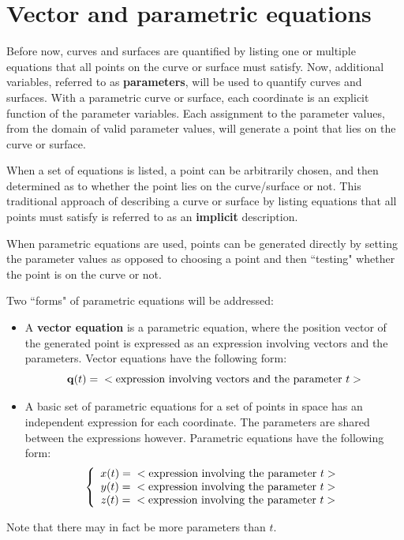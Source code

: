 \documentclass{article}
\begin{document}
\section*{Vector and parametric equations}

Before now, curves and surfaces are quantified by listing one or multiple equations that all points on the curve or surface must satisfy. Now, additional variables, referred to as {\bf parameters}, will be used to quantify curves and surfaces. With a parametric curve or surface, each coordinate is an explicit function of the parameter variables. Each assignment to the parameter values, from the domain of valid parameter values, will generate a point that lies on the curve or surface. 

When a set of equations is listed, a point can be arbitrarily chosen, and then determined as to whether the point lies on the curve/surface or not. This traditional approach of describing a curve or surface by listing equations that all points must satisfy is referred to as an {\bf implicit} description. 

When parametric equations are used, points can be generated directly by setting the parameter values as opposed to choosing a point and then ``testing" whether the point is on the curve or not.

Two ``forms" of parametric equations will be addressed:
\begin{itemize}
\item A {\bf vector equation} is a parametric equation, where the position vector of the generated point is expressed as an expression involving vectors and the parameters. Vector equations have the following form:
\[\mathbf{q}(t) = \;\; <\textnormal{expression involving vectors and the parameter \(t\)}>\]
\item A basic set of parametric equations for a set of points in space has an independent expression for each coordinate. The parameters are shared between the expressions however. Parametric equations have the following form:
\[\left\{\begin{array}{c} 
x(t) = \;\; <\textnormal{expression involving the parameter \(t\)}> \\
y(t) = \;\; <\textnormal{expression involving the parameter \(t\)}> \\
z(t) = \;\; <\textnormal{expression involving the parameter \(t\)}> \\
\end{array}\right.\]
\end{itemize}
Note that there may in fact be more parameters than \(t\). 
\end{document}
